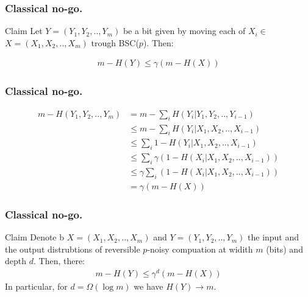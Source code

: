 \documentclass{beamer}
\begin{document}
\begin{frame}
  \frametitle{Classical no-go.}
  
\begin{block}{Claim}
  Let $Y = \left(Y_{1}, Y_{2}, .., Y_{m}\right)$ be a bit given by moving each of $X_i \in$ $X = \left(X_{1}, X_{2}, .., X_{m}\right)$  trough BSC($p$). Then:

  \begin{equation*}
    \begin{split}
      m - H(Y) \le \gamma\left( m - H(X) \right)
    \end{split}
  \end{equation*}
\end{block}

\end{frame}
\begin{frame}
  \frametitle{Classical no-go.}
  
  \begin{equation*}
    \begin{split}
      m - H\left( Y_{1}, Y_{2}, .., Y_{m} \right) &= m - \sum_{i} H\left( Y_{i} | Y_{1}, Y_{2}, .., Y_{i-1} \right) \\ 
      & \le m - \sum_{i} H\left( Y_{i} | X_{1}, X_{2}, .., X_{i-1} \right) \\ 
      & \le \sum_{i} 1 - H\left( Y_{i} | X_{1}, X_{2}, .., X_{i-1} \right) \\ 
      & \le \sum_{i} \gamma\left(1 - H\left( X_{i} | X_{1}, X_{2}, .., X_{i-1} \right)\right) \\ 
      & \le \gamma \sum_{i} \left(1 - H\left( X_{i} | X_{1}, X_{2}, .., X_{i-1} \right)\right)  \\
      &= \gamma\left( m - H\left( X \right) \right)
    \end{split}
  \end{equation*}
\end{frame}
\begin{frame}
  \frametitle{Classical no-go.}
  
  
\begin{block}{Claim}
  Denote b $X = (X_{1}, X_{2}, .., X_{m})$ and $Y = (Y_1, Y_2 , .. ,Y_m)$ the input and the output distrubtions of reversible $p$-noisy compuation at widith $m$ (bits) and depth $d$. Then, there: 
  \begin{equation*}
    \begin{split}
      m - H(Y) \le \gamma^{d}\left( m - H(X) \right) 
    \end{split}
  \end{equation*}
  In particular, for $d = \Omega(\log m)$ we have $H(Y) \rightarrow m$. 


\end{block}


\end{frame}
\end{document}
